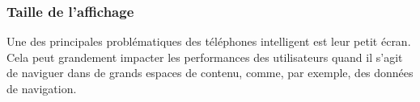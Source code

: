 

\iffalse
\subsubsection{IHM autres que du IHM multiaffichage}
\paragraph{}
IHM hybride : mobile pour entrée, et hmd pour sortie \cite{LeeBudhirajaBillinghurst2013}
\fi


\subsubsection{Taille de l'affichage}
Une des principales problématiques des téléphones intelligent est leur petit écran. Cela peut grandement impacter les performances des utilisateurs quand il s'agit de naviguer dans de grands espaces de contenu, comme, par exemple, des données de navigation.


